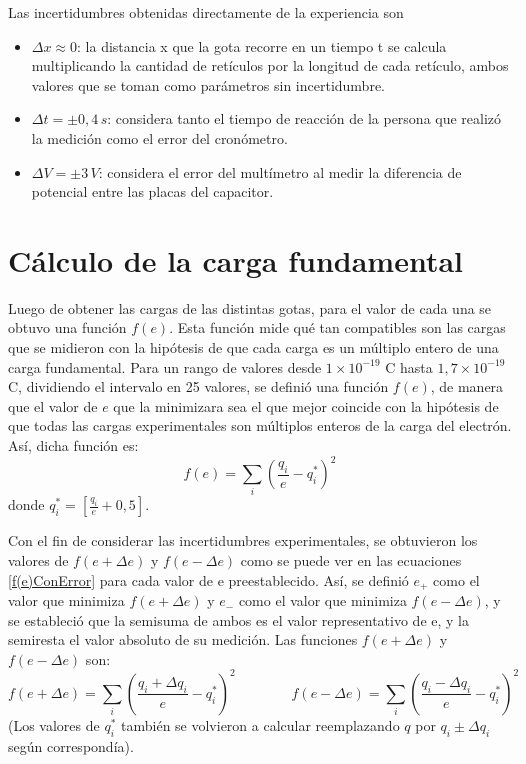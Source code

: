 \documentclass{article}
\begin{document}
Las incertidumbres obtenidas directamente de la experiencia son
\begin{itemize}
    \item $\Delta x\approx 0$: la distancia x que la gota recorre en un tiempo t se calcula multiplicando la cantidad de retículos por la longitud de cada retículo, ambos valores que se toman como parámetros sin incertidumbre.
    \item $\Delta t = \pm 0,4\,s$: considera tanto el tiempo de reacción de la persona que realizó la medición como el error del cronómetro.
    \item $\Delta V=\pm 3 \, V$: considera el error del multímetro al medir la diferencia de potencial entre las placas del capacitor.
\end{itemize}

\section{Cálculo de la carga fundamental}

Luego de obtener las cargas de las distintas gotas, para el valor de cada una se obtuvo una función $f(e)$. Esta función mide qué tan compatibles son las cargas que se midieron con la hipótesis de que cada carga es un múltiplo entero de una carga fundamental. Para un rango de valores desde $1 \times 10^{-19}$ C hasta $1{,}7 \times 10^{-19}$ C, dividiendo el intervalo en 25 valores, se definió una función $f(e)$, de manera que el valor de $e$ que la minimizara sea el que mejor coincide con la hipótesis de que todas las cargas experimentales son múltiplos enteros de la carga del electrón. Así, dicha función es:
\[
f(e)=\sum_i\left(\frac{q_i}{e}-q_i^*\right)^2
\]
donde $q_i^*=\left[\frac{q_i}{e}+0,5\right] $.

Con el fin de considerar las incertidumbres experimentales, se obtuvieron los valores de $f(e+\Delta e)$ y $f(e-\Delta e)$ como se puede ver en las ecuaciones \ref{f(e)ConError} para cada valor de e preestablecido. Así, se definió $e_+$ como el valor que minimiza $f(e+\Delta e)$ y $e_-$ como el valor que minimiza $f(e-\Delta e)$, y se estableció que la semisuma de ambos es el valor representativo de e, y la semiresta el valor absoluto de su medición. Las funciones $f(e+\Delta e)$ y $f(e-\Delta e)$ son:
\begin{equation}
    f(e+\Delta e)=\sum_i\left(\frac{q_i+\Delta q_i}{e}-q_i^*\right)^2 
    \qquad \qquad
    f(e-\Delta e)=\sum_i\left(\frac{q_i-\Delta q_i}{e}-q_i^*\right)^2    
\end{equation} \label{f(e)ConError}
(Los valores de $q_i^*$ también se volvieron a calcular reemplazando $q$ por $q_i \pm \Delta q_i$ según correspondía).
\end{document}
